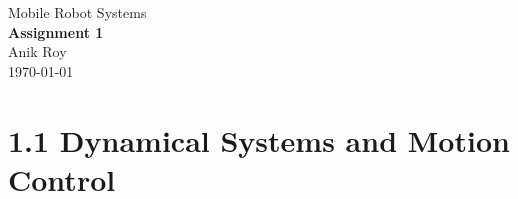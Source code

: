 \documentclass[12pt,a4paper]{article}
\begin{document}
\vfil

\begin{center}
	{\Large Mobile Robot Systems} \\
	\vspace{0.4in}
	{\huge \bf Assignment 1 } \\
	\vspace{0.4in}
	{\large Anik Roy} \\
	\vspace{0.1in}
	{\large \today} \\
\end{center}
\vspace{0.4in}


\section*{1.1 Dynamical Systems and Motion Control}
\end{document}
